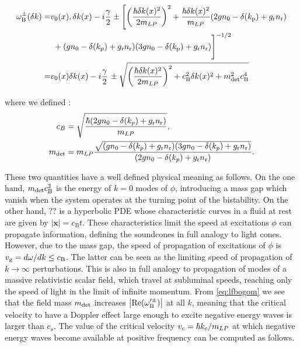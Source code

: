 \begin{align}\label{eq:lfbogom}
    \omega^\pm_\mathrm{B}(\delta k)=&v_0(x) ,\delta k(x)-i\frac{\gamma}{2}\nonumber\pm\Biggl[\left(\frac{\hbar\delta k(x)^2}{2 m_{LP}}\right)^2+\frac{\hbar \delta k(x)^2}{m_{LP}}(2g n_0 - \delta(k_\mathrm{p})+g_\mathrm{r}n_\mathrm{r})\\
    &\,\,+(g n_0 - \delta(k_\mathrm{p})+g_\mathrm{r}n_\mathrm{r})(3 g n_0 - \delta(k_\mathrm{p})+g_\mathrm{r}n_\mathrm{r})\Biggr]^{-1/2}\nonumber\\
    =&v_0(x) \delta k(x)-i\frac{\gamma}{2}\,\pm\sqrt{\left(\frac{\hbar\delta k(x)^2}{2 m_{LP}}\right)^2+c_\mathrm{B}^2\delta k(x)^2+m_{\mathrm{det}}^2c_\mathrm{B}^4}
\end{align}

where we defined :
\begin{subequations}
    \label{eq:m_bog}
    \begin{align}
    c_B & = \sqrt{\dfrac{\hbar(2gn_0- \delta(k_p)+g_\mathrm{r}n_\mathrm{r})}{m_{LP}}},\\
    m_{\mathrm{det}}&=m_{LP}\dfrac{\sqrt{(gn_0- \delta(k_p)+g_\mathrm{r}n_\mathrm{r})(3gn_0- \delta(k_p)+g_\mathrm{r}n_\mathrm{r})}}{(2gn_0- \delta(k_p)+g_\mathrm{r}n_\mathrm{r})}.
    \end{align}
\end{subequations}

These two quantities have a well defined physical meaning as follows. 
On the one hand, $m_{\mathrm{det}} c_\mathrm{B}^2$ is the energy of $k=0$ modes of $\phi$, introducing a mass gap which vanish when the system operates at the turning point of the bistability.
On the other hand, ?? is a hyperbolic PDE whose characteristic curves in a fluid at rest are given by $|\pmb{x}|=c_\mathrm{B} t$. These characteristics limit the speed at excitations $\phi$ can propagate information, defining the soundcones in full analogy to light cones. However, due to the mass gap, the speed of propagation of excitations of $\phi$ is $v_{\rm g}=d\omega/dk\leq c_\mathrm{B}$. 
The latter can be seen as the limiting speed of propagation of $k\to\infty$ perturbations. This is also in full analogy to propagation of modes of a massive relativistic scalar field, which travel at subluminal speeds, reaching only the speed of light in the limit of infinite momentum.
From \autoref{eq:lfbogom} we see that the field mass $m_{\mathrm{det}}$ increases $\abs{\mathrm{Re}(\omega_\mathrm{B}^{\prime\pm})}$ at all $k$, meaning that the critical velocity to have a Doppler effect large enough to excite negative energy  waves is larger than $c_s$.
The value of the critical velocity $v_c=\hbar k_c/m_{LP}$ at which negative energy waves become available at positive frequency can be computed as follows. 


